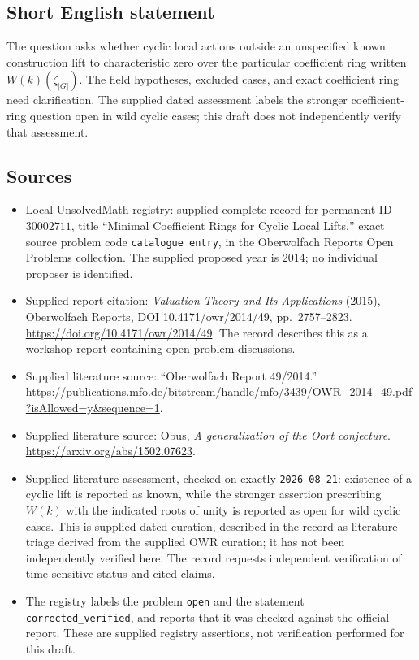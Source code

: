 \documentclass[11pt]{article}
\begin{document}
\subsection{Short English statement}
The question asks whether cyclic local actions outside an unspecified known construction lift to characteristic zero over the particular coefficient ring written \(W(k)(\zeta_{|G|})\). The field hypotheses, excluded cases, and exact coefficient ring need clarification. The supplied dated assessment labels the stronger coefficient-ring question open in wild cyclic cases; this draft does not independently verify that assessment.
\subsection{Sources}
\begin{itemize}
\item Local UnsolvedMath registry: supplied complete record for permanent ID \(30002711\), title ``Minimal Coefficient Rings for Cyclic Local Lifts,'' exact source problem code \texttt{catalogue entry}, in the Oberwolfach Reports Open Problems collection. The supplied proposed year is 2014; no individual proposer is identified.
\item Supplied report citation: \emph{Valuation Theory and Its Applications} (2015), Oberwolfach Reports, DOI 10.4171/owr/2014/49, pp.\ 2757--2823. \url{https://doi.org/10.4171/owr/2014/49}. The record describes this as a workshop report containing open-problem discussions.
\item Supplied literature source: ``Oberwolfach Report 49/2014.'' \url{https://publications.mfo.de/bitstream/handle/mfo/3439/OWR_2014_49.pdf?isAllowed=y&sequence=1}.
\item Supplied literature source: Obus, \emph{A generalization of the Oort conjecture}. \url{https://arxiv.org/abs/1502.07623}.
\item Supplied literature assessment, checked on exactly \texttt{2026-08-21}: existence of a cyclic lift is reported as known, while the stronger assertion prescribing \(W(k)\) with the indicated roots of unity is reported as open for wild cyclic cases. This is supplied dated curation, described in the record as literature triage derived from the supplied OWR curation; it has not been independently verified here. The record requests independent verification of time-sensitive status and cited claims.
\item The registry labels the problem \texttt{open} and the statement \texttt{corrected\_verified}, and reports that it was checked against the official report. These are supplied registry assertions, not verification performed for this draft.
\end{itemize}
\end{document}
